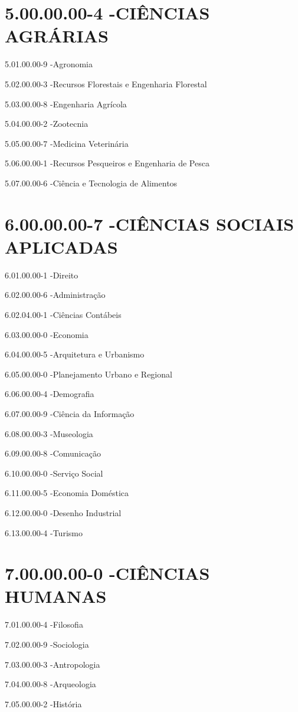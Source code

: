 \section*{5.00.00.00-4 -CIÊNCIAS AGRÁRIAS}

5.01.00.00-9 -Agronomia

5.02.00.00-3 -Recursos Florestais e Engenharia Florestal

5.03.00.00-8 -Engenharia Agrícola

5.04.00.00-2 -Zootecnia

5.05.00.00-7 -Medicina Veterinária

5.06.00.00-1 -Recursos Pesqueiros e Engenharia de Pesca

5.07.00.00-6 -Ciência e Tecnologia de Alimentos

\section*{6.00.00.00-7 -CIÊNCIAS SOCIAIS APLICADAS}

6.01.00.00-1 -Direito

6.02.00.00-6 -Administração

6.02.04.00-1 -Ciências Contábeis

6.03.00.00-0 -Economia

6.04.00.00-5 -Arquitetura e Urbanismo

6.05.00.00-0 -Planejamento Urbano e Regional

6.06.00.00-4 -Demografia

6.07.00.00-9 -Ciência da Informação

6.08.00.00-3 -Museologia

6.09.00.00-8 -Comunicação

6.10.00.00-0 -Serviço Social

6.11.00.00-5 -Economia Doméstica

6.12.00.00-0 -Desenho Industrial

6.13.00.00-4 -Turismo

\section*{7.00.00.00-0 -CIÊNCIAS HUMANAS}

7.01.00.00-4 -Filosofia

7.02.00.00-9 -Sociologia

7.03.00.00-3 -Antropologia

7.04.00.00-8 -Arqueologia

7.05.00.00-2 -História

